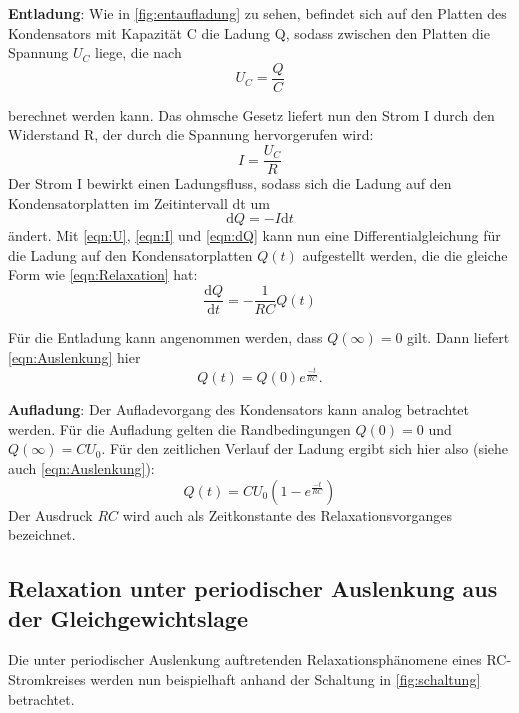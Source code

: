 \textbf{Entladung}:
Wie in \autoref{fig:entaufladung} zu sehen, befindet sich auf den Platten des Kondensators mit Kapazität C die Ladung Q, sodass zwischen den Platten die Spannung $U_C$ liege, die nach 
\begin{equation}
    U_C = \frac{Q}{C}
    \label{eqn:U}
\end{equation}

berechnet werden kann. Das ohmsche Gesetz liefert nun den Strom I durch den Widerstand R, der durch die Spannung hervorgerufen wird:
\begin{equation}
    I =   \frac{U_C}{R}
    \label{eqn:I}
\end{equation}
Der Strom I bewirkt einen Ladungsfluss, sodass sich die Ladung auf den Kondensatorplatten im Zeitintervall dt um
\begin{equation}
    \text{d}Q = -I \text{d}t
    \label{eqn:dQ}
\end{equation}
ändert. Mit \autoref{eqn:U}, \autoref{eqn:I} und \autoref{eqn:dQ} kann nun eine Differentialgleichung für die Ladung auf den Kondensatorplatten $Q(t)$ aufgestellt werden, die die gleiche Form wie \autoref{eqn:Relaxation} hat:
\begin{equation}
        \frac{\text{d}Q}{\text{d}t}  = - \frac{1}{RC} Q(t) 
\end{equation}

Für die Entladung kann angenommen werden, dass $Q(\infty)=0$ gilt. Dann liefert \autoref{eqn:Auslenkung} hier \newline
\begin{equation}
    Q(t)= Q(0) e^{\frac{-t}{RC}} \text{.}
    \label{eqn:Qentl}
\end{equation}


\textbf{Aufladung}:
Der Aufladevorgang des Kondensators kann analog betrachtet werden. Für die Aufladung gelten die Randbedingungen $Q(0)=0$ und $Q(\infty)=CU_0$. Für den zeitlichen Verlauf der Ladung ergibt sich hier also (siehe auch \autoref{eqn:Auslenkung}):
\begin{equation}
    Q(t)= CU_0 (1-e^{\frac{-t}{RC}}) 
    \label{eqn:Qaufl}
\end{equation}
Der Ausdruck $RC$ wird auch als Zeitkonstante des Relaxationsvorganges bezeichnet.

\subsection{Relaxation unter periodischer Auslenkung aus der Gleichgewichtslage}
Die unter periodischer Auslenkung auftretenden Relaxationsphänomene eines RC-Stromkreises werden nun beispielhaft anhand der Schaltung in \autoref{fig:schaltung} betrachtet.

